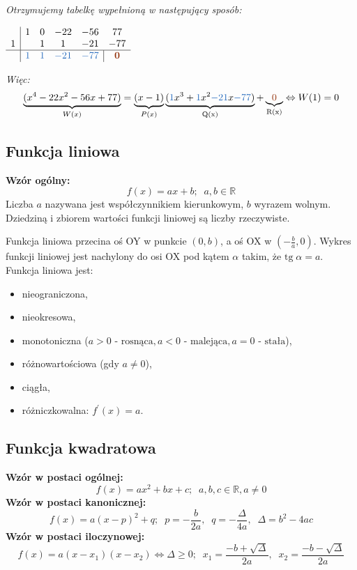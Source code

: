 \documentclass[14pt,a4paper]{extarticle}
\begin{document}
\noindent\textit{Otrzymujemy tabelkę wypełnioną w następujący sposób:}\\
\begin{center}
   $\begin{array}{c|ccccc}
      & 1 & 0 & -22 & -56 & 77\\
    1 &   & 1 &  1   & -21 & -77\\ \hline
      & \textcolor{NavyBlue}{1} & \textcolor{NavyBlue}{1} &  \textcolor{NavyBlue}{-21}   &\multicolumn{1}{c|}{\textcolor{NavyBlue}{-77} }  & \textbf{\textcolor{RawSienna}{0}}
   \end{array}$
\end{center}

\noindent\textit{Więc:}\\
$$\underbrace{(x^{4}-22x^{2}-56x+77)}_{W(x)} = \underbrace{(x - 1)}_{P(x)}\underbrace{(\textcolor{NavyBlue}{1}x^{3} + \textcolor{NavyBlue}{1}x^{2} \textcolor{NavyBlue}{- 21}x \textcolor{NavyBlue}{- 77})}_{\text{Q(x)}} + \underbrace{\textcolor{RawSienna}{0}}_{\text{R(x)}} \Leftrightarrow W(1) = 0$$

\subsection{Funkcja liniowa}
\noindent\textbf{Wzór ogólny:}
$$f(x) = ax + b;\;\; a, b \in \mathbb{R}$$
Liczba $a$ nazywana jest współczynnikiem kierunkowym, $b$ wyrazem wolnym. Dziedziną i zbiorem wartości
funkcji liniowej są liczby rzeczywiste.\hfill\break
\vspace{1pt}

\noindent Funkcja liniowa przecina oś OY w punkcie $(0, b)$, a oś OX w $(-\frac{b}{a}, 0)$. Wykres funkcji liniowej 
jest nachylony do osi OX pod kątem $\alpha$ takim, że $\text{tg}\;\alpha = a$.\\

\noindent Funkcja liniowa jest:
\begin{itemize}
   \item nieograniczona,
   \item nieokresowa,
   \item monotoniczna ($a > 0 \text{ - rosnąca}, a < 0 \text{ - malejąca}, a = 0 \text{ - stała}$),
   \item różnowartościowa (gdy $a \neq 0$),
   \item ciągła,
   \item różniczkowalna: $f^{\prime}(x) = a$.
\end{itemize}

\subsection{Funkcja kwadratowa}
\noindent\textbf{Wzór w postaci ogólnej:}
$$f(x) = ax^{2} + bx + c;\;\; a, b, c \in \mathbb{R}, a \neq 0$$
\noindent\textbf{Wzór w postaci kanonicznej:}
$$f(x) = a(x - p)^{2} + q;\;\; p = -\frac{b}{2a},\;\; q = -\frac{\Delta}{4a}, \;\; \Delta = b^{2} -4ac$$
\noindent\textbf{Wzór w postaci iloczynowej:}
$$f(x) = a(x - x_{1})(x - x_{2}) \Leftrightarrow \Delta \geq 0; \;\; x_{1} = \frac{-b + \sqrt{\Delta}}{2a},\;\; x_{2} = \frac{-b - \sqrt{\Delta}}{2a}$$
\end{document}
